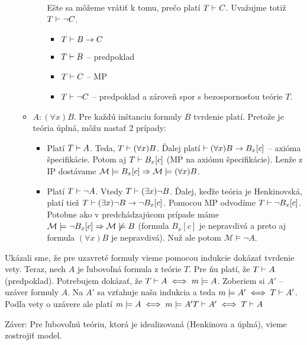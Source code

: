 \begin{dokaz}
\begin{itemize}
\begin{itemize}
\begin{itemize}
                Ešte sa môžeme vrátiť k tomu, prečo platí $T \vdash C$.
                Uvažujme totiž $T \vdash \neg C$.
                \begin{itemize}
                \item $T \vdash B \rightarrow C$
                \item $T \vdash B$ -- predpoklad
                \item $T \vdash C$ -- MP
                \item $T \vdash \neg C$ -- predpoklad a zároveň
                    spor s bezospornosťou teórie $T$.
                \end{itemize}
            \end{itemize}

        \item $A: (\forall x) B$. Pre každú
            inštanciu formuly $B$ tvrdenie platí.
            Pretože je teória úplná, môžu nastať 2 prípady:
            \begin{itemize}
            \item Platí $T\vdash A$.
                Teda, $T \vdash (\forall x) B$.
                Ďalej platí $\vdash (\forall x) B \rightarrow B_x[c]$
                -- axióma špecifikácie.
                Potom aj $T \vdash B_x[c]$ (MP na axiómu
                špecifikácie). Lenže z IP dostávame
                $\mathcal{M} \models B_x[c] \Rightarrow 
                 \mathcal{M} \models (\forall x) B$.

            \item Platí $T \vdash \neg A$. Vtedy
                $T \vdash (\exists x) \neg B$. Ďalej, keďže teória je
                Henkinovská, platí tiež 
                $T \vdash (\exists x) \neg B \rightarrow \neg B_x[c]$.
                Pomocou MP odvodíme
                $T \vdash \neg B_x[c]$. Potobne ako v
                predchádzajúcom prípade máme
                $\mathcal{M} \models \neg B_x[c] \Rightarrow
                 \mathcal{M} \not \models B$ (formula $B_x[c]$ je
                 nepravdivá a preto aj formula $(\forall x) B$ je
                 nepravdivá). Nuž ale potom
                 $\mathcal{M} \models \neg A$.
            \end{itemize}

        \end{itemize}
    \end{itemize}

    Ukázali sme, že pre uzavreté formuly vieme pomocou indukcie
    dokázať tvrdenie vety. Teraz, nech $A$ je ľubovoľná formula z teórie $T$.
    Pre ňu platí, že $T \vdash A$ (predpoklad).
    Potrebujem dokázať, že $T \vdash A \iff m \models A$.
    Zoberiem si $A'$ -- uzáver formuly $A$.
    Na $A'$ sa vzťahuje naša indukcia a teda $m \models A' \iff T \vdash A'$.
    Podľa vety o uzávere ale platí
    $m \models A \iff  m\models A' T \vdash A' \iff T \vdash A$
\end{dokaz}

\par{Záver:} Pre ľubovoľnú teóriu, ktorá je idealizovaná (Henkinova a
úplná), vieme zostrojiť model.

